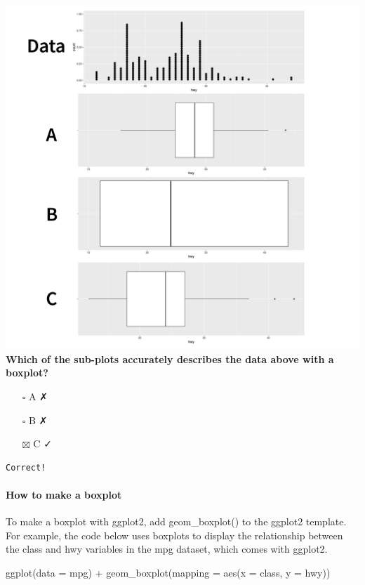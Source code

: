 \documentclass[
]{article}
\newenvironment{Shaded}{\begin{snugshade}}{\end{snugshade}}
\newcommand{\AttributeTok}[1]{\textcolor[rgb]{0.77,0.63,0.00}{#1}}
\newcommand{\FunctionTok}[1]{\textcolor[rgb]{0.00,0.00,0.00}{#1}}
\newcommand{\NormalTok}[1]{#1}
\newcommand{\SpecialCharTok}[1]{\textcolor[rgb]{0.00,0.00,0.00}{#1}}
\providecommand{\tightlist}{%
  \setlength{\itemsep}{0pt}\setlength{\parskip}{0pt}}
\begin{document}
\includegraphics{data/3-4-box-png.png} \textbf{Which of the sub-plots
accurately describes the data above with a boxplot?}

\begin{itemize}
\tightlist
\item[$\square$]
  A ✗
\item[$\square$]
  B ✗
\item[$\boxtimes$]
  C ✓
\end{itemize}

\begin{verbatim}
Correct!
\end{verbatim}

\hypertarget{how-to-make-a-boxplot}{%
\paragraph{How to make a boxplot}\label{how-to-make-a-boxplot}}

To make a boxplot with ggplot2, add geom\_boxplot() to the ggplot2
template. For example, the code below uses boxplots to display the
relationship between the class and hwy variables in the mpg dataset,
which comes with ggplot2.

\begin{Shaded}
\begin{Highlighting}[]
\FunctionTok{ggplot}\NormalTok{(}\AttributeTok{data =}\NormalTok{ mpg) }\SpecialCharTok{+}
  \FunctionTok{geom\_boxplot}\NormalTok{(}\AttributeTok{mapping =} \FunctionTok{aes}\NormalTok{(}\AttributeTok{x =}\NormalTok{ class, }\AttributeTok{y =}\NormalTok{ hwy))}
\end{Highlighting}
\end{Shaded}
\end{document}
